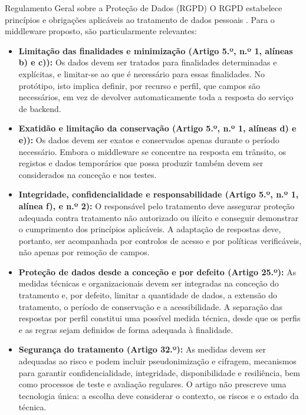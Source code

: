 \documentclass[12pt,reqno, twoside]{amsbook}
\makeatletter
\def\section{\@startsection{section}{1}%
      \z@{.5\linespacing\@plus.7\linespacing}{.25\linespacing}%
      {\normalfont\bfseries\flushleft}}
\theoremstyle{plain}
\numberwithin{equation}{chapter}
\numberwithin{table}{chapter}
\numberwithin{figure}{chapter}
\numberwithin{section}{chapter}
\makeatother
\begin{document}
\section{Regulamento Geral sobre a Proteção de Dados (RGPD)}
\noindent O RGPD estabelece princípios e obrigações aplicáveis ao tratamento de dados pessoais \cite{rgpd2016}. Para o middleware proposto, são particularmente relevantes:
\begin{itemize}[leftmargin=*]
    \item \textbf{Limitação das finalidades e minimização (Artigo 5.º, n.º 1, alíneas b) e c)):} Os dados devem ser tratados para finalidades determinadas e explícitas, e limitar-se ao que é necessário para essas finalidades. No protótipo, isto implica definir, por recurso e perfil, que campos são necessários, em vez de devolver automaticamente toda a resposta do serviço de backend.
    \item \textbf{Exatidão e limitação da conservação (Artigo 5.º, n.º 1, alíneas d) e e)):} Os dados devem ser exatos e conservados apenas durante o período necessário. Embora o middleware se concentre na resposta em trânsito, os registos e dados temporários que possa produzir também devem ser considerados na conceção e nos testes.
    \item \textbf{Integridade, confidencialidade e responsabilidade (Artigo 5.º, n.º 1, alínea f), e n.º 2):} O responsável pelo tratamento deve assegurar proteção adequada contra tratamento não autorizado ou ilícito e conseguir demonstrar o cumprimento dos princípios aplicáveis. A adaptação de respostas deve, portanto, ser acompanhada por controlos de acesso e por políticas verificáveis, não apenas por remoção de campos.
    \item \textbf{Proteção de dados desde a conceção e por defeito (Artigo 25.º):} As medidas técnicas e organizacionais devem ser integradas na conceção do tratamento e, por defeito, limitar a quantidade de dados, a extensão do tratamento, o período de conservação e a acessibilidade. A separação das respostas por perfil constitui uma possível medida técnica, desde que os perfis e as regras sejam definidos de forma adequada à finalidade.
    \item \textbf{Segurança do tratamento (Artigo 32.º):} As medidas devem ser adequadas ao risco e podem incluir pseudonimização e cifragem, mecanismos para garantir confidencialidade, integridade, disponibilidade e resiliência, bem como processos de teste e avaliação regulares. O artigo não prescreve uma tecnologia única: a escolha deve considerar o contexto, os riscos e o estado da técnica.
\end{itemize}
\end{document}
